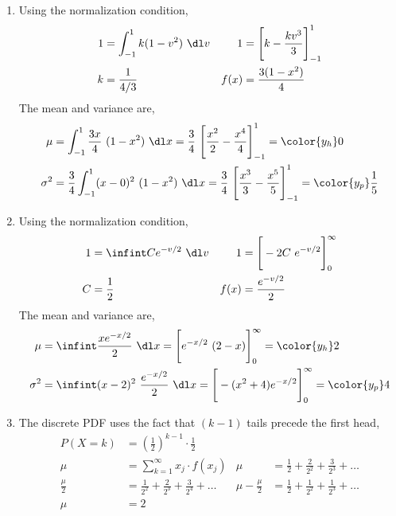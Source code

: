\begin{enumerate}
    \item Using the normalization condition,
          \begin{align}
              1    & = \int_{-1}^{1} k(1-v^2)\ \dl v             &
              1    & = \Bigg[ k - \frac{kv^3}{3} \Bigg]_{-1}^{1}   \\
              k    & = \frac{1}{4/3}                             &
              f(x) & = \frac{3(1-x^2)}{4}
          \end{align}
          The mean and variance are,
          \begin{align}
              \mu      & = \int_{-1}^{1} \frac{3x}{4}\ (1-x^2)\ \dl x
              = \frac{3}{4}\ \Bigg[ \frac{x^2}{2} - \frac{x^4}{4} \Bigg]_{-1}^{1}
              = \color{y_h} 0                                                 \\
              \sigma^2 & = \frac{3}{4}\int_{-1}^{1} (x - 0)^2\ (1-x^2)\ \dl x
              = \frac{3}{4}\ \Bigg[ \frac{x^3}{3} - \frac{x^5}{5} \Bigg]_{-1}^{1}
              = \color{y_p} \frac{1}{5}
          \end{align}

    \item Using the normalization condition,
          \begin{align}
              1    & = \infint Ce^{-v/2}\ \dl v                 &
              1    & = \Bigg[ -2C\ e^{-v/2} \Bigg]_{0}^{\infty}   \\
              C    & = \frac{1}{2}                              &
              f(x) & = \frac{e^{-v/2}}{2}
          \end{align}
          The mean and variance are,
          \begin{align}
              \mu      & = \infint \frac{xe^{-x/2}}{2}\ \dl x
              = \Bigg[e^{-x/2}\ (2 - x) \Bigg]_{0}^{\infty}
              = \color{y_h} 2                                           \\
              \sigma^2 & = \infint (x - 2)^2\ \frac{e^{-x/2}}{2}\ \dl x
              = \Bigg[ -(x^2 + 4)e^{-x/2} \Bigg]_{0}^{\infty}
              = \color{y_p} 4
          \end{align}

    \item The discrete PDF uses the fact that $ (k-1) $ tails precede the first head,
          \begin{align}
              P(X=k)        & = \left( \frac{1}{2} \right)^{k-1} \cdot \frac{1}{2}    \\
              \mu           & = \sum_{k=1}^{\infty} x_j \cdot f(x_j)                &
              \mu           & = \frac{1}{2} + \frac{2}{2^2} + \frac{3}{2^3}
              + \dots                                                                 \\
              \frac{\mu}{2} & = \frac{1}{2^2} + \frac{2}{2^3} + \frac{3}{2^4}
              + \dots       &
              \mu - \frac{\mu}{2}
                            & = \frac{1}{2} + \frac{1}{2^2} + \frac{1}{2^3} + \dots   \\
              \mu           & = 2
          \end{align}


\end{enumerate}
